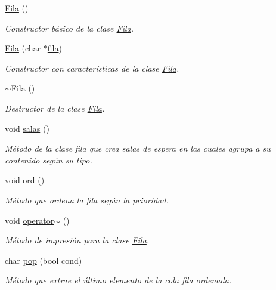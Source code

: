 \begin{DoxyCompactItemize}
\item 
\hyperlink{class_fila_ad758c612ef929ffb32cdceb442a5e6a5}{Fila} ()
\begin{DoxyCompactList}\small\item\em Constructor básico de la clase \hyperlink{class_fila}{Fila}. \end{DoxyCompactList}\item 
\hyperlink{class_fila_a2b120e186a1e620ee2c6bacf2c0ea44c}{Fila} (char $\ast$\hyperlink{class_fila_a36a3d7e1492ea5bc367a23f6af9d1ce7}{fila})
\begin{DoxyCompactList}\small\item\em Constructor con características de la clase \hyperlink{class_fila}{Fila}. \end{DoxyCompactList}\item 
\hyperlink{class_fila_af747f8a50e93b382c78e0576a5b40426}{$\sim$\+Fila} ()
\begin{DoxyCompactList}\small\item\em Destructor de la clase \hyperlink{class_fila}{Fila}. \end{DoxyCompactList}\item 
void \hyperlink{class_fila_a1b4a951498a56359211cc3334050c362}{salas} ()
\begin{DoxyCompactList}\small\item\em Método de la clase fila que crea salas de espera en las cuales agrupa a su contenido según su tipo. \end{DoxyCompactList}\item 
void \hyperlink{class_fila_a37535ed9d5d95be4c8c06f216818f7bd}{ord} ()
\begin{DoxyCompactList}\small\item\em Método que ordena la fila según la prioridad. \end{DoxyCompactList}\item 
void \hyperlink{class_fila_a329402e2861273f0b15c23a080a7ff3b}{operator$\sim$} ()
\begin{DoxyCompactList}\small\item\em Método de impresión para la clase \hyperlink{class_fila}{Fila}. \end{DoxyCompactList}\item 
char \hyperlink{class_fila_a56d36d67fb631d3a1ec48bf3b6e55e40}{pop} (bool cond)
\begin{DoxyCompactList}\small\item\em Método que extrae el último elemento de la cola fila ordenada. \end{DoxyCompactList}\end{DoxyCompactItemize}
